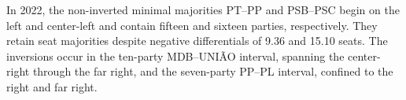 \documentclass[11pt]{article}
\begin{document}


In 2022, the non-inverted minimal majorities PT--PP and PSB--PSC begin
on the left and center-left and contain fifteen and sixteen parties,
respectively. They retain seat majorities despite negative differentials
of 9.36 and 15.10 seats. The inversions occur in the ten-party
MDB--UNIÃO interval, spanning the center-right through the far right,
and the seven-party PP--PL interval, confined to the right and far right.

\end{document}
